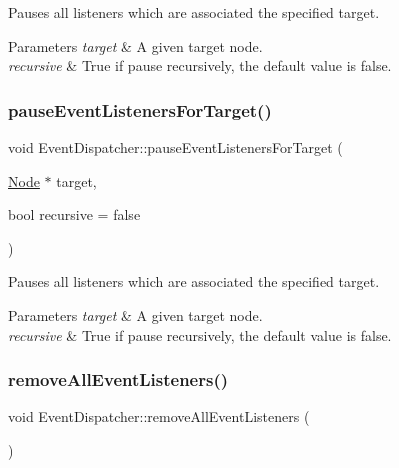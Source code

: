 Pauses all listeners which are associated the specified target.


\begin{DoxyParams}{Parameters}
{\em target} & A given target node. \\
\hline
{\em recursive} & True if pause recursively, the default value is false. \\
\hline
\end{DoxyParams}
\mbox{\label{classEventDispatcher_a33dbf3057a30a92f741fd1465b70363f}} 
\subsubsection{\texorpdfstring{pause\+Event\+Listeners\+For\+Target()}{pauseEventListenersForTarget()}\hspace{0.1cm}{\footnotesize\ttfamily [2/2]}}
{\footnotesize\ttfamily void Event\+Dispatcher\+::pause\+Event\+Listeners\+For\+Target (\begin{DoxyParamCaption}\item[{\hyperlink{classNode}{Node} $\ast$}]{target,  }\item[{bool}]{recursive = {\ttfamily false} }\end{DoxyParamCaption})}

Pauses all listeners which are associated the specified target.


\begin{DoxyParams}{Parameters}
{\em target} & A given target node. \\
\hline
{\em recursive} & True if pause recursively, the default value is false. \\
\hline
\end{DoxyParams}
\mbox{\label{classEventDispatcher_aa7bba43c3e78f0957937d985fe13e0fe}} 
\subsubsection{\texorpdfstring{remove\+All\+Event\+Listeners()}{removeAllEventListeners()}\hspace{0.1cm}{\footnotesize\ttfamily [1/2]}}
{\footnotesize\ttfamily void Event\+Dispatcher\+::remove\+All\+Event\+Listeners (\begin{DoxyParamCaption}{ }\end{DoxyParamCaption})}

